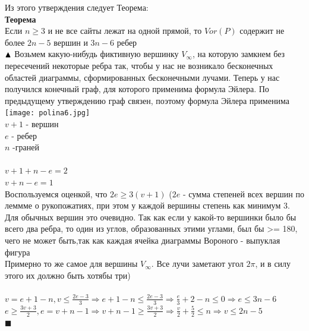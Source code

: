 Из этого утверждения следует Теорема:
\\
\textbf{Теорема}\\
Если $n \geq 3$ и не все сайты лежат на одной прямой, то $Vor(P)$ содержит не более $2n - 5$ вершин и $3n - 6$ ребер
\\
$\blacktriangle \\$ Возьмем какую-нибудь фиктивную вершинку $V_{\infty}$, на которую замкнем без пересечений некоторые ребра так, чтобы у нас не возникало бесконечных областей диаграммы, сформированных бесконечными лучами. Теперь у нас получился конечный граф, для которого применима формула Эйлера. По предыдущему утверждению граф связен, поэтому формула Эйлера применима \\
\texttt{[image: polina6.jpg]} \\
$v+1$ - вершин \\
$e$ - ребер \\
$n$ -граней
\\
\\
$v+1+n-e = 2$
\\
$v+n-e = 1$
\\
Воспользуемся оценкой, что $2e \geq 3(v+1)$ ($2e$ - сумма степеней всех вершин по леммме о рукопожатиях, при этом у каждой вершины степень как минимум 3.
\\
Для обычных вершин это очевидно. Так как если у какой-то вершинки было бы всего два ребра, то один из углов, образованных этими углами, был бы >= 180, чего не может быть,так как каждая ячейка диаграммы Вороного - выпуклая фигура
\\
Примерно то же самое для вершины $V_{\infty}$. Все лучи заметают угол $2\pi$, и в силу этого их должно быть хотябы три)
\\
\\
$v = e + 1 - n, v \leq \frac{2e -3}{3} \Longrightarrow e + 1 - n \leq \frac{2e -3}{3} \Longrightarrow \frac{e}{3} +2 - n \leq 0 \Longrightarrow e \leq 3n - 6$
\\
$e \geq  \frac{3v+3}{2}, e = v+n-1 \Longrightarrow v + n - 1 \geq \frac{3v+3}{2}  \Longrightarrow \frac{v}{2} + \frac{5}{2} \leq n \Longrightarrow v \leq 2n-5$
\\
$\blacksquare$
\newpage{}

